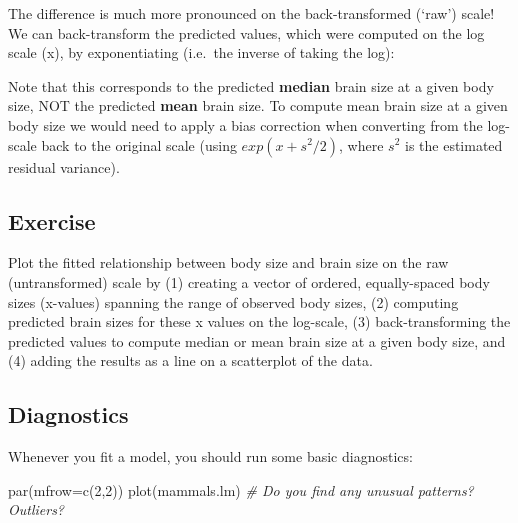 \documentclass[
]{article}
\newenvironment{Shaded}{\begin{snugshade}}{\end{snugshade}}
\newcommand{\AttributeTok}[1]{\textcolor[rgb]{0.77,0.63,0.00}{#1}}
\newcommand{\CommentTok}[1]{\textcolor[rgb]{0.56,0.35,0.01}{\textit{#1}}}
\newcommand{\DecValTok}[1]{\textcolor[rgb]{0.00,0.00,0.81}{#1}}
\newcommand{\FunctionTok}[1]{\textcolor[rgb]{0.00,0.00,0.00}{#1}}
\newcommand{\NormalTok}[1]{#1}
\newcommand{\SpecialCharTok}[1]{\textcolor[rgb]{0.00,0.00,0.00}{#1}}
\begin{document}
The difference is much more pronounced on the back-transformed (`raw')
scale! We can back-transform the predicted values, which were computed
on the log scale (x), by exponentiating (i.e.~the inverse of taking the
log):

\begin{Shaded}
\end{Shaded}

Note that this corresponds to the predicted \textbf{median} brain size
at a given body size, NOT the predicted \textbf{mean} brain size. To
compute mean brain size at a given body size we would need to apply a
bias correction when converting from the log-scale back to the original
scale (using \(exp(x + s^{2}/2)\), where \(s^{2}\) is the estimated
residual variance).

\hypertarget{exercise}{%
\subsection{Exercise}\label{exercise}}

Plot the fitted relationship between body size and brain size on the raw
(untransformed) scale by (1) creating a vector of ordered,
equally-spaced body sizes (x-values) spanning the range of observed body
sizes, (2) computing predicted brain sizes for these x values on the
log-scale, (3) back-transforming the predicted values to compute median
or mean brain size at a given body size, and (4) adding the results as a
line on a scatterplot of the data.

\hypertarget{diagnostics}{%
\subsection{Diagnostics}\label{diagnostics}}

Whenever you fit a model, you should run some basic diagnostics:

\begin{Shaded}
\begin{Highlighting}[]
\FunctionTok{par}\NormalTok{(}\AttributeTok{mfrow=}\FunctionTok{c}\NormalTok{(}\DecValTok{2}\NormalTok{,}\DecValTok{2}\NormalTok{))}
\FunctionTok{plot}\NormalTok{(mammals.lm)        }\CommentTok{\# Do you find any unusual patterns? Outliers?}
\end{Highlighting}
\end{Shaded}
\end{document}

